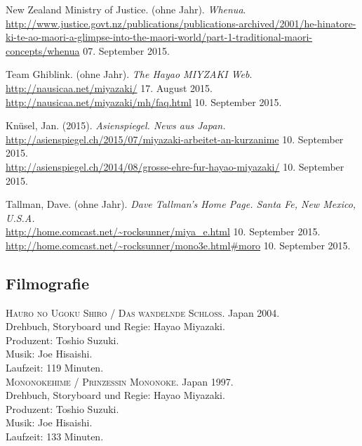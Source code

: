 \documentclass[a4paper]{article}
\begin{document}
\begin{thebibliography}{9}
	New Zealand Ministry of Justice.
	(ohne Jahr).
	\emph{Whenua}.\\
	\url{http://www.justice.govt.nz/publications/publications-archived/2001/he-hinatore-ki-te-ao-maori-a-glimpse-into-the-maori-world/part-1-traditional-maori-concepts/whenua}	07. September 2015.

	Team Ghiblink. (ohne Jahr). \emph{The Hayao MIYZAKI Web}.\\  
	\url{http://nausicaa.net/miyazaki/} 17. August 2015.\\
	\url{http://nausicaa.net/miyazaki/mh/faq.html} 10. September 2015.

	Knüsel, Jan. (2015). \emph{Asienspiegel. News aus Japan.}\\ \url{http://asienspiegel.ch/2015/07/miyazaki-arbeitet-an-kurzanime} 10. September 2015.\\ \url{http://asienspiegel.ch/2014/08/grosse-ehre-fur-hayao-miyazaki/} 10. September 2015.

	Tallman, Dave. (ohne Jahr). \emph{Dave Tallman's Home Page. Santa Fe, New Mexico, U.S.A.}\\ \url{http://home.comcast.net/~rocksunner/miya_e.html} 10. September 2015.\\ \url{http://home.comcast.net/~rocksunner/mono3e.html#moro} 10. September 2015.

\subsection*{Filmografie}

	\textsc{Hauro no Ugoku Shiro / Das wandelnde Schloss}.
	Japan 2004. \\
	Drehbuch, Storyboard und Regie: Hayao Miyazaki.\\
	Produzent: Toshio Suzuki. \\
	Musik: Joe Hisaishi. \\
	Laufzeit: 119 Minuten. \\

	\textsc{Mononokehime / Prinzessin Mononoke}.
	Japan 1997. \\
	Drehbuch, Storyboard und Regie: Hayao Miyazaki.\\
	Produzent: Toshio Suzuki. \\
	Musik: Joe Hisaishi. \\
	Laufzeit: 133 Minuten. \\


\end{thebibliography}
\end{document}
